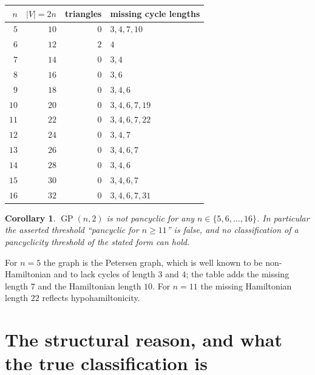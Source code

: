 \documentclass[11pt]{article}
\newtheorem{corollary}[theorem]{Corollary}
\theoremstyle{definition}
\theoremstyle{remark}
\newcommand{\GP}{\operatorname{GP}}
\begin{document}
\begin{center}
\begin{tabular}{r r r l}
\toprule
$n$ & $|V| = 2n$ & triangles & missing cycle lengths \\
\midrule
$5$  & $10$ & $0$ & $3, 4, 7, 10$ \\
$6$  & $12$ & $2$ & $4$ \\
$7$  & $14$ & $0$ & $3, 4$ \\
$8$  & $16$ & $0$ & $3, 6$ \\
$9$  & $18$ & $0$ & $3, 4, 6$ \\
$10$ & $20$ & $0$ & $3, 4, 6, 7, 19$ \\
$11$ & $22$ & $0$ & $3, 4, 6, 7, 22$ \\
$12$ & $24$ & $0$ & $3, 4, 7$ \\
$13$ & $26$ & $0$ & $3, 4, 6, 7$ \\
$14$ & $28$ & $0$ & $3, 4, 6$ \\
$15$ & $30$ & $0$ & $3, 4, 6, 7$ \\
$16$ & $32$ & $0$ & $3, 4, 6, 7, 31$ \\
\bottomrule
\end{tabular}
\end{center}

\begin{corollary}
$\GP(n,2)$ is not pancyclic for any $n \in \{5, 6, \dots, 16\}$. In particular
the asserted threshold ``pancyclic for $n \ge 11$'' is false, and no
classification of a pancyclicity threshold of the stated form can hold.
\end{corollary}

For $n = 5$ the graph is the Petersen graph, which is well known to be
non-Hamiltonian and to lack cycles of length $3$ and $4$; the table adds the
missing length $7$ and the Hamiltonian length $10$. For $n = 11$ the missing
Hamiltonian length $22$ reflects hypohamiltonicity.

\section{The structural reason, and what the true classification is}
\label{sec:remark}
\end{document}
